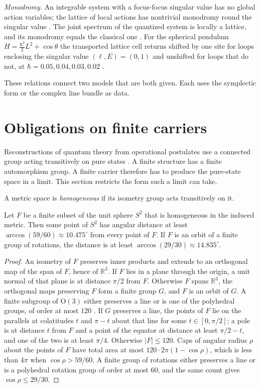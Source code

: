 \emph{Monodromy.} An integrable system with a focus-focus singular value has no global action variables; the lattice of local actions has nontrivial monodromy round the singular value \cite{duistermaat,cushman}. The joint spectrum of the quantized system is locally a lattice, and its monodromy equals the classical one \cite{vungoc}. For the spherical pendulum $H=\tfrac{\hbar^2}{2}L^2+\cos\theta$ the transported lattice cell returns shifted by one site for loops enclosing the singular value $(\ell,E)=(0,1)$ and unshifted for loops that do not, at $\hbar=0.05,0.04,0.03,0.02$ \cite{comp}.

These relations connect two models that are both given. Each uses the symplectic form or the complex line bundle as data.

\section{Obligations on finite carriers}\label{sec:finite}

Reconstructions of quantum theory from operational postulates use a connected group acting transitively on pure states \cite{hardy,masanesmueller}. A finite structure has a finite automorphism group. A finite carrier therefore has to produce the pure-state space in a limit. This section restricts the form such a limit can take.

A metric space is \emph{homogeneous} if its isometry group acts transitively on it.

\begin{proposition}\label{prop:bloch}
Let $F$ be a finite subset of the unit sphere $S^2$ that is homogeneous in the induced metric. Then some point of $S^2$ has angular distance at least $\arccos(59/60)\approx10.475^\circ$ from every point of $F$. If $F$ is an orbit of a finite group of rotations, the distance is at least $\arccos(29/30)\approx14.835^\circ$.
\end{proposition}
\begin{proof}
An isometry of $F$ preserves inner products and extends to an orthogonal map of the span of $F$, hence of $\mathbb{R}^3$. If $F$ lies in a plane through the origin, a unit normal of that plane is at distance $\pi/2$ from $F$. Otherwise $F$ spans $\mathbb{R}^3$, the orthogonal maps preserving $F$ form a finite group $G$, and $F$ is an orbit of $G$. A finite subgroup of $\mathrm{O}(3)$ either preserves a line or is one of the polyhedral groups, of order at most $120$ \cite{coxeter}. If $G$ preserves a line, the points of $F$ lie on the parallels at colatitudes $t$ and $\pi-t$ about that line for some $t\in[0,\pi/2]$; a pole is at distance $t$ from $F$ and a point of the equator at distance at least $\pi/2-t$, and one of the two is at least $\pi/4$. Otherwise $|F|\le120$. Caps of angular radius $\rho$ about the points of $F$ have total area at most $120\cdot2\pi(1-\cos\rho)$, which is less than $4\pi$ when $\cos\rho>59/60$. A finite group of rotations either preserves a line or is a polyhedral rotation group of order at most $60$, and the same count gives $\cos\rho\le29/30$.
\end{proof}

